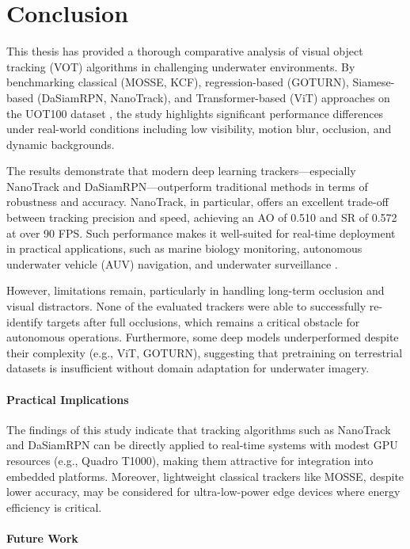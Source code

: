 \chapter{Conclusion}
This thesis has provided a thorough comparative analysis of visual object tracking (VOT) algorithms in challenging underwater environments. By benchmarking classical (MOSSE, KCF), regression-based (GOTURN), Siamese-based (DaSiamRPN, NanoTrack), and Transformer-based (ViT) approaches on the UOT100 dataset \cite{kezebou2019underwater}, the study highlights significant performance differences under real-world conditions including low visibility, motion blur, occlusion, and dynamic backgrounds.

The results demonstrate that modern deep learning trackers—especially NanoTrack and DaSiamRPN—outperform traditional methods in terms of robustness and accuracy. NanoTrack, in particular, offers an excellent trade-off between tracking precision and speed, achieving an AO of 0.510 and SR of 0.572 at over 90 FPS. Such performance makes it well-suited for real-time deployment in practical applications, such as marine biology monitoring, autonomous underwater vehicle (AUV) navigation, and underwater surveillance \cite{qiu2024boundary,elmezain2025advancing}.

However, limitations remain, particularly in handling long-term occlusion and visual distractors. None of the evaluated trackers were able to successfully re-identify targets after full occlusions, which remains a critical obstacle for autonomous operations. Furthermore, some deep models underperformed despite their complexity (e.g., ViT, GOTURN), suggesting that pretraining on terrestrial datasets is insufficient without domain adaptation for underwater imagery.

\subsubsection{Practical Implications} 
The findings of this study indicate that tracking algorithms such as NanoTrack and DaSiamRPN can be directly applied to real-time systems with modest GPU resources (e.g., Quadro T1000), making them attractive for integration into embedded platforms. Moreover, lightweight classical trackers like MOSSE, despite lower accuracy, may be considered for ultra-low-power edge devices where energy efficiency is critical.

\subsubsection{Future Work}

